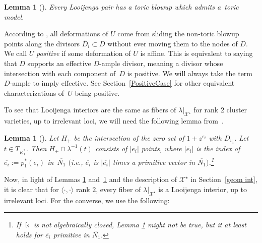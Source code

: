 \documentclass[pdftex]{sigma}
\numberwithin{equation}{section}
\numberwithin{figure}{section}
\numberwithin{table}{section}
\let\?=\overline
\let\s=\mathcal
\newcommand {\kk} {\Bbbk}
\newtheorem{lem}[thm]{Lemma}
\theoremstyle{definition}
\begin{document}
\begin{lem}[{\cite[Proposition~1.19]{GHK1}}]\label{ToricModel} Every Looijenga pair has a toric blowup which admits a~toric model.
\end{lem}

According to \cite{GHK2}, all deformations of $U$ come from sliding the non-toric blowup points along the divisors $\?{D}_i\subset D$ without ever moving them to the nodes of $D$. We call $U$ {\it positive} if some deformation of $U$ is affine. This is equivalent to saying that $D$ supports an effective $D$-ample divisor, meaning a divisor whose intersection with each component of~$D$ is positive. We will always take the term $D$-ample to imply effective. See Section~\ref{PositiveCase} for other equivalent characterizations of~$U$ being positive.

To see that Looijenga interiors are the same as fibers of $\lambda|_{\s{X}^{\star}}$ for rank $2$ cluster varieties, up to irrelevant loci, we will need the following lemma from~\cite{GHK3}.

\begin{lem}[{\cite[Lemma 5.1]{GHK3}}]\label{Fibers}
Let $H_+$ be the intersection of the zero set of $1+z^{e_i}$ with $D_{v_i}$. Let $t\in T_{K_1^*}$. Then $H_+\cap \lambda^{-1}(t)$ consists of $|\?{e_i}|$ points, where $|\?{e_i}|$ is the index of $\?{e_i}:=p_1^*(e_i)$ in~$\?{N_1}$ $($i.e., $\?{e_i}$ is $|\?{e_i}|$ times a primitive vector in $\?{N_1})$.\footnote{If $\kk$ is not algebraically closed, Lemma \ref{Fibers} might not be true, but it at least holds for $\?{e_i}$ primitive in $\?{N_1}$.}
\end{lem}

Now, in light of Lemmas \ref{ToricModel} and~\ref{Fibers} and the description of $\s{X}^{\star}$ in Section~\ref{geom int}, it is clear that for $\langle \cdot,\cdot \rangle$ rank $2$, every fiber of $\lambda|_{\s{X}^{\star}}$ is a Looijenga interior, up to irrelevant loci. For the converse, we use the following:
\end{document}

